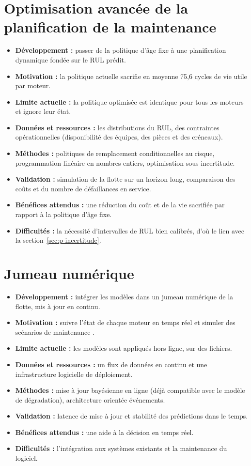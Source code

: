 \section{Optimisation avancée de la planification de la maintenance}\label{sec:p-planification}

\begin{itemize}
\item \textbf{Développement :} passer de la politique d'âge fixe à une planification dynamique fondée sur le RUL prédit.
\item \textbf{Motivation :} la politique actuelle sacrifie en moyenne 75,6 cycles de vie utile par moteur.
\item \textbf{Limite actuelle :} la politique optimisée est identique pour tous les moteurs et ignore leur état.
\item \textbf{Données et ressources :} les distributions du RUL, des contraintes opérationnelles (disponibilité des équipes, des pièces et des créneaux).
\item \textbf{Méthodes :} politiques de remplacement conditionnelles au risque, programmation linéaire en nombres entiers, optimisation sous incertitude.
\item \textbf{Validation :} simulation de la flotte sur un horizon long, comparaison des coûts et du nombre de défaillances en service.
\item \textbf{Bénéfices attendus :} une réduction du coût et de la vie sacrifiée par rapport à la politique d'âge fixe.
\item \textbf{Difficultés :} la nécessité d'intervalles de RUL bien calibrés, d'où le lien avec la section~\ref{sec:p-incertitude}.
\end{itemize}

\section{Jumeau numérique}\label{sec:p-jumeau}

\begin{itemize}
\item \textbf{Développement :} intégrer les modèles dans un jumeau numérique de la flotte, mis à jour en continu.
\item \textbf{Motivation :} suivre l'état de chaque moteur en temps réel et simuler des scénarios de maintenance \cite{tao2019}.
\item \textbf{Limite actuelle :} les modèles sont appliqués hors ligne, sur des fichiers.
\item \textbf{Données et ressources :} un flux de données en continu et une infrastructure logicielle de déploiement.
\item \textbf{Méthodes :} mise à jour bayésienne en ligne (déjà compatible avec le modèle de dégradation), architecture orientée événements.
\item \textbf{Validation :} latence de mise à jour et stabilité des prédictions dans le temps.
\item \textbf{Bénéfices attendus :} une aide à la décision en temps réel.
\item \textbf{Difficultés :} l'intégration aux systèmes existants et la maintenance du logiciel.
\end{itemize}

